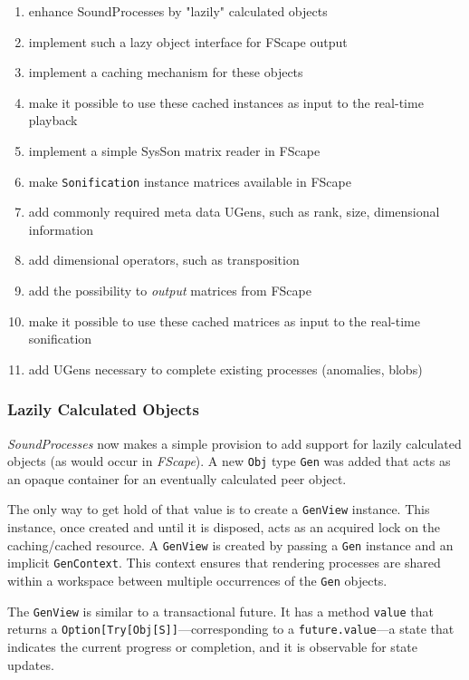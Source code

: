 \documentclass[11pt,a4paper]{article}
\newcommand{\software}[1]{\textit{#1}}
\begin{document}
\begin{enumerate}
\item enhance SoundProcesses by "lazily" calculated objects
\item implement such a lazy object interface for FScape output
\item implement a caching mechanism for these objects
\item make it possible to use these cached instances as input to the real-time playback
\item implement a simple SysSon matrix reader in FScape
%
\item make \verb!Sonification! instance matrices available in FScape
\item add commonly required meta data UGens, such as rank, size, dimensional information
\item add dimensional operators, such as transposition
\item add the possibility to \emph{output} matrices from FScape
\item make it possible to use these cached matrices as input to the real-time sonification
\item add UGens necessary to complete existing processes (anomalies, blobs)
\end{enumerate}

\subsubsection{Lazily Calculated Objects}

\software{SoundProcesses} now makes a simple provision to add support for lazily calculated objects (as would occur in \software{FScape}). A new \Verb!Obj! type \Verb!Gen! was added that acts as an opaque container for an eventually calculated peer object.

The only way to get hold of that value is to create a \Verb!GenView! instance. This instance, once created and until it is disposed, acts as an acquired lock on the caching/cached resource. A \Verb!GenView! is created by passing a \Verb!Gen! instance and an implicit \Verb!GenContext!. This context ensures that rendering processes are shared within a workspace between multiple occurrences of the \Verb!Gen! objects.

The \Verb!GenView! is similar to a transactional future. It has a method \Verb!value! that returns a \Verb!Option[Try[Obj[S]]!---corresponding to a \Verb!future.value!---a state that indicates the current progress or completion, and it is observable for state updates.
\end{document}
